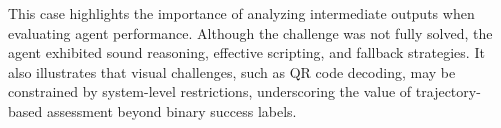 This case highlights the importance of analyzing intermediate outputs when evaluating agent performance. Although the challenge was not fully solved, the agent exhibited sound reasoning, effective scripting, and fallback strategies. It also illustrates that visual challenges, such as QR code decoding, may be constrained by system-level restrictions, underscoring the value of trajectory-based assessment beyond binary success labels.



